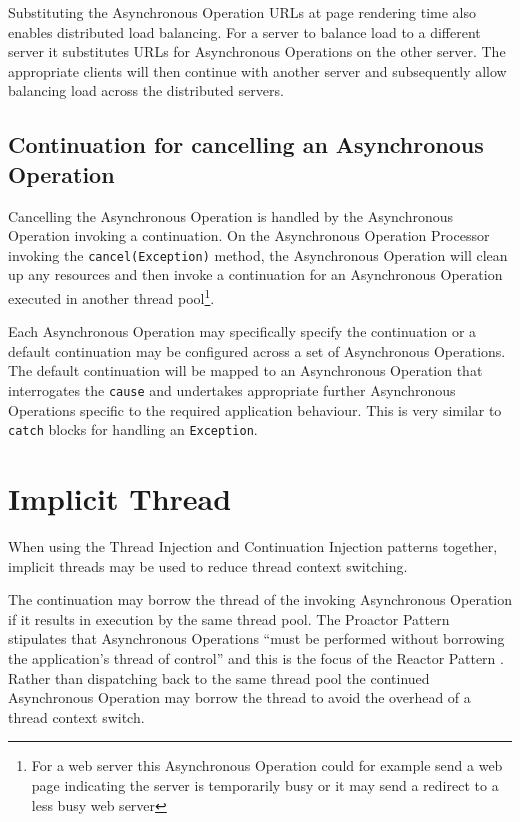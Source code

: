 \documentclass[prodmode]{style/acmlarge}
\begin{document}
Substituting the Asynchronous Operation URLs at page rendering time also enables
distributed load balancing.  For a server to balance load to a different server
it substitutes URLs for Asynchronous Operations on the other server. The
appropriate clients will then continue with another server and subsequently
allow balancing load across the distributed servers.


\subsection{Continuation for cancelling an Asynchronous Operation}

Cancelling the Asynchronous Operation is handled by the Asynchronous Operation
invoking a continuation.  On the Asynchronous Operation Processor invoking the
\texttt{cancel(Exception)} method, the Asynchronous Operation will clean up any
resources and then invoke a continuation for an Asynchronous Operation executed
in another thread pool\footnote{For a web server this Asynchronous Operation
could for example send a web page indicating the server is temporarily busy or
it may send a redirect to a less busy web server}.

Each Asynchronous Operation may specifically specify the continuation or a
default continuation may be configured across a set of Asynchronous Operations.
The default continuation will be mapped to an Asynchronous Operation that
interrogates the \texttt{cause} and undertakes appropriate further Asynchronous
Operations specific to the required application behaviour.  This is very similar
to \texttt{catch} blocks for handling an \texttt{Exception}.


\section{Implicit Thread}

When using the Thread Injection and Continuation Injection patterns together,
implicit threads may be used to reduce thread context switching.

The continuation may borrow the thread of the invoking Asynchronous Operation if
it results in execution by the same thread pool.  The Proactor Pattern
stipulates that Asynchronous Operations ``must be performed without borrowing
the application's thread of control'' \cite[p. 8]{proactor} and this is the
focus of the Reactor Pattern \cite{reactor}.  Rather than dispatching back to
the same thread pool the continued Asynchronous Operation may borrow the thread
to avoid the overhead of a thread context switch.
\end{document}
